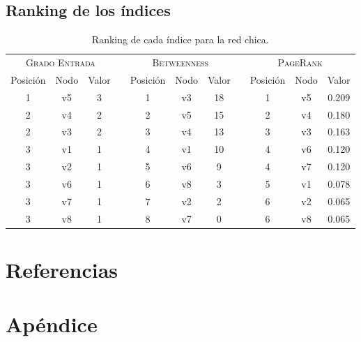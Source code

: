 \documentclass[letterpaper]{article}
\begin{document}
\subsection{Ranking de los índices}
\begin{table}[H]
  \centering
  \renewcommand{\arraystretch}{1.1}
  \begin{tabular}{@{}ccccccccccc@{}}
    \toprule
       \multicolumn{3}{c}{\textsc{Grado Entrada}} & \phantom{abc} & \multicolumn{3}{c}{\textsc{Betweenness}} & \phantom{abc} & \multicolumn{3}{c}{\textsc{PageRank}}\\
       \cmidrule{1-3}\cmidrule{5-7}\cmidrule{9-11}
       Posición & Nodo & Valor & & Posición & Nodo & Valor & & Posición & Nodo & Valor\\
       \midrule
      1 & v5 & 3 &&  1 & v3 & 18 && 1 & v5 & 0.209 \\
      2 & v4 & 2 &&  2 & v5 & 15 && 2 & v4 & 0.180 \\
      2 & v3 & 2 &&  3 & v4 & 13 && 3 & v3 & 0.163 \\
      3 & v1 & 1 &&  4 & v1 & 10 && 4 & v6 & 0.120 \\
      3 & v2 & 1 &&  5 & v6 & 9  && 4 & v7 & 0.120 \\
      3 & v6 & 1 &&  6 & v8 & 3  && 5 & v1 & 0.078 \\
      3 & v7 & 1 &&  7 & v2 & 2  && 6 & v2 & 0.065 \\
      3 & v8 & 1 &&  8 & v7 & 0  && 6 & v8 & 0.065 \\
    \bottomrule
  \end{tabular}
  \caption{Ranking de cada índice para la red chica.}
\end{table}


\section{Referencias}
\section{Apéndice}
\end{document}
